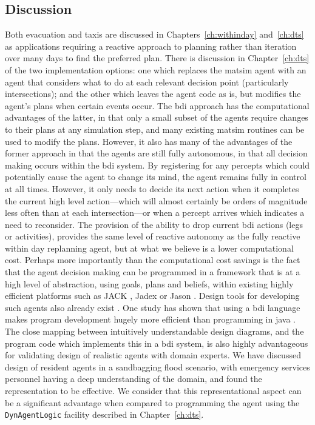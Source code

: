\subsection{Discussion}
Both evacuation and taxis are discussed in Chapters~\ref{ch:withinday} and~\ref{ch:dts} 
as applications requiring a reactive approach to planning
rather than iteration over many days to find the preferred plan. There
is discussion in Chapter~\ref{ch:dts} of the two implementation options: one
which replaces the \gls{matsim} agent with an agent that considers what to
do at each relevant decision point (particularly intersections); and
the other which leaves the agent code as is, but modifies the agent's
plans when certain events occur. The \gls{bdi} approach has the computational
advantages of the latter, in that only a small subset of the agents
require changes to their plans at any simulation step, and many
existing \gls{matsim} routines can be used to modify the plans. However, it
also has many of the advantages of the former approach in that the
agents are still fully autonomous, in that all decision making occurs
within the \gls{bdi} system. By registering for any percepts which could
potentially cause the agent to change its mind, the agent remains
fully in control at all times. However, it only needs to decide its next action
when it completes the current high level action---which will almost
certainly be orders of magnitude less often than at each intersection---or when 
a percept arrives which indicates a need to reconsider. The
provision of the ability to drop current \gls{bdi} actions (legs or
activities), provides the same level of reactive autonomy as the fully
reactive within day replanning agent, but at what we believe is a
lower computational cost. 
%
Perhaps more importantly than the computational cost savings is the
fact that the agent decision making can be programmed in a framework
that is at a high level of abstraction, using goals, plans and
beliefs, within existing highly efficient platforms such as JACK
\cite{jackref}, Jadex \cite{jadex2005} or Jason \cite{jason}. Design
tools for developing such agents also already exist
\cite{prometheusbook}. One study has shown that using a \gls{bdi} language
makes program development hugely more efficient than programming in
\gls{java} \cite{benfield}. The close mapping between intuitively
understandable design diagrams, and the program code which implements
this in a \gls{bdi} system, is also highly advantageous for validating
design of realistic agents with domain experts. We have discussed
design of resident agents in a sandbagging flood scenario, with
emergency services personnel having a deep understanding of the
domain, and found the representation to be effective. We consider that
this representational aspect can be a significant advantage when
compared to programming the agent using the \lstinline{DynAgentLogic}
facility described in Chapter~\ref{ch:dts}.









